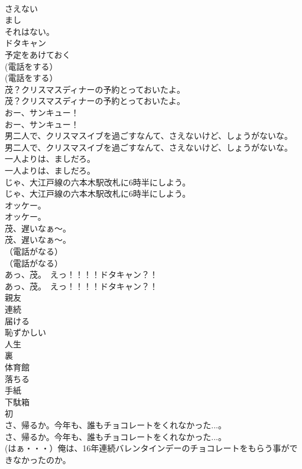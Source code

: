 \documentclass[8pt]{extreport}
\begin{document}
\begin{CJK}{UTF8}{min}
\\	さえない
\\	まし
\\	それはない。
\\	ドタキャン
\\	予定をあけておく
\\	(電話をする）	
\\	(電話をする） 
\\	茂？クリスマスディナーの予約とっておいたよ。	
\\	茂？クリスマスディナーの予約とっておいたよ。 
\\	おー、サンキュー！	
\\	おー、サンキュー！ 
\\	男二人で、クリスマスイブを過ごすなんて、さえないけど、しょうがないな。	
\\	男二人で、クリスマスイブを過ごすなんて、さえないけど、しょうがないな。 
\\	一人よりは、ましだろ。	
\\	一人よりは、ましだろ。 
\\	じゃ、大江戸線の六本木駅改札に6時半にしよう。	
\\	じゃ、大江戸線の六本木駅改札に6時半にしよう。 
\\	オッケー。	
\\	オッケー。 
\\	茂、遅いなぁ～。	
\\	茂、遅いなぁ～。 
\\	（電話がなる）	
\\	（電話がなる） 
\\	あっ、茂。　えっ！！！！ドタキャン？！	
\\	あっ、茂。　えっ！！！！ドタキャン？！ 
\\	親友
\\	連続
\\	届ける
\\	恥ずかしい
\\	人生
\\	裏
\\	体育館
\\	落ちる
\\	手紙
\\	下駄箱
\\	初
\\	さ、帰るか。今年も、誰もチョコレートをくれなかった...。	
\\	さ、帰るか。今年も、誰もチョコレートをくれなかった...。 
\\	(はぁ・・・）俺は、16年連続バレンタインデーのチョコレートをもらう事ができなかったのか。	

\end{CJK}
\end{document}
